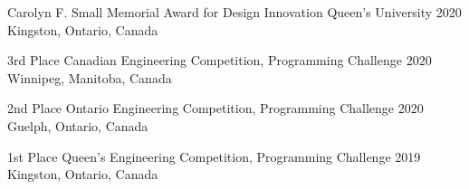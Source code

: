 



\begin{cvhonors}


  \cvhonor
    {Carolyn F. Small Memorial Award for Design Innovation} %
    {Queen's University} %
    {2020} %
    {Kingston, Ontario, Canada} %

  \cvhonor
    {3rd Place} %
    {Canadian Engineering Competition, Programming Challenge} %
    {2020} %
    {Winnipeg, Manitoba, Canada} %

  \cvhonor
    {2nd Place} %
    {Ontario Engineering Competition, Programming Challenge} %
    {2020} %
    {Guelph, Ontario, Canada} %

  \cvhonor
    {1st Place} %
    {Queen's Engineering Competition, Programming Challenge} %
    {2019} %
    {Kingston, Ontario, Canada} %
    
\end{cvhonors}